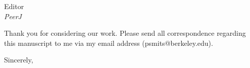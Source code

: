 \documentclass{letter}
\begin{document}
\begin{letter}{Editor \\ \textit{PeerJ}}

  Thank you for considering our work. Please send all correspondence regarding this manuscript to me via my email address (psmits@berkeley.edu).

  \closing{Sincerely,}


\end{letter}
\end{document}
